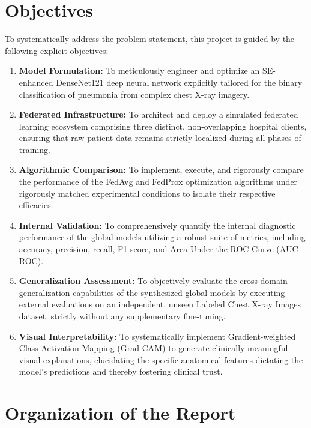 \documentclass[12pt,a4paper]{report}
\begin{document}
\section{Objectives}

To systematically address the problem statement, this project is guided by the following explicit objectives:
\begin{enumerate}
    \item \textbf{Model Formulation:} To meticulously engineer and optimize an SE-enhanced DenseNet121 deep neural network explicitly tailored for the binary classification of pneumonia from complex chest X-ray imagery.
    \item \textbf{Federated Infrastructure:} To architect and deploy a simulated federated learning ecosystem comprising three distinct, non-overlapping hospital clients, ensuring that raw patient data remains strictly localized during all phases of training.
    \item \textbf{Algorithmic Comparison:} To implement, execute, and rigorously compare the performance of the FedAvg and FedProx optimization algorithms under rigorously matched experimental conditions to isolate their respective efficacies.
    \item \textbf{Internal Validation:} To comprehensively quantify the internal diagnostic performance of the global models utilizing a robust suite of metrics, including accuracy, precision, recall, F1-score, and Area Under the ROC Curve (AUC-ROC).
    \item \textbf{Generalization Assessment:} To objectively evaluate the cross-domain generalization capabilities of the synthesized global models by executing external evaluations on an independent, unseen Labeled Chest X-ray Images dataset, strictly without any supplementary fine-tuning.
    \item \textbf{Visual Interpretability:} To systematically implement Gradient-weighted Class Activation Mapping (Grad-CAM) to generate clinically meaningful visual explanations, elucidating the specific anatomical features dictating the model's predictions and thereby fostering clinical trust.
\end{enumerate}

\section{Organization of the Report}
\end{document}
